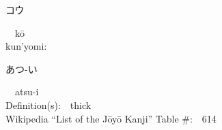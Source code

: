 \begin{multicols}{2}
{\hspace*{2em}}{\begin{CJK}{UTF8}{min} コウ \end{CJK}}\ \ k\=o\ \ \\
{\hspace*{1em}}kun'yomi:\ \ \\
{\hspace*{2em}}{\begin{CJK}{UTF8}{min} あつ-い \end{CJK}}\ \ atsu-i\ \ \\
Definition(s):\ \ thick \\
Wikipedia ``List of the J\=oy\=o Kanji'' Table \#:\ \ 614 \\
\ \ \\
\end{multicols}



